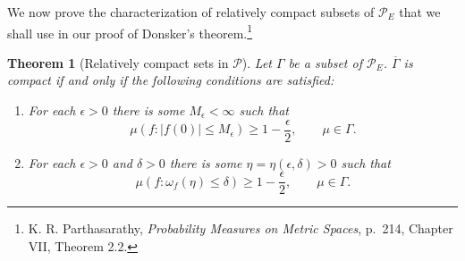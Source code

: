 \documentclass{article}
\newtheorem{theorem}{Theorem}
\theoremstyle{definition}
\begin{document}
We now prove the characterization of relatively compact subsets of $\mathscr{P}_E$ that we shall use in our proof of Donsker's theorem.\footnote{K. R.
Parthasarathy, {\em Probability Measures on Metric Spaces}, p.~214, Chapter VII, Theorem 2.2.}

\begin{theorem}[Relatively compact sets in $\mathscr{P}$]
Let $\Gamma$ be a subset of $\mathscr{P}_E$. $\overline{\Gamma}$ is compact if and only if the following conditions are satisfied:
\begin{enumerate}
\item For each $\epsilon>0$ there is some $M_\epsilon<\infty$ such that 
\[
\mu(f:|f(0)| \leq M_\epsilon) \geq 1-\frac{\epsilon}{2},\qquad \mu \in \Gamma.
\]
\item For each $\epsilon>0$ and $\delta>0$ there is some $\eta = \eta(\epsilon,\delta)>0$ such that 
\[
\mu(f : \omega_f(\eta) \leq \delta) \geq 1-\frac{\epsilon}{2},\qquad \mu \in \Gamma.
\]
\end{enumerate}
\label{theorem22}
\end{theorem}
\end{document}
